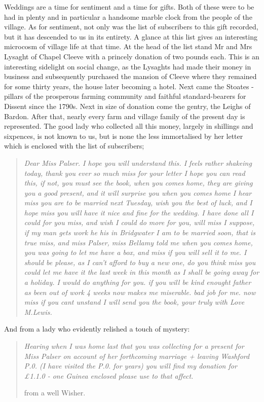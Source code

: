 Weddings are a time for sentiment and a time for gifts. Both of these were to be had in plenty and in particular a handsome marble clock from the people of the village. As for sentiment, not only was the list of subscribers to this gift recorded, but it has descended to us in its entirety. A glance at this list gives an interesting microcosm of village life at that time. At the head of the list stand Mr and Mrs Lysaght of Chapel Cleeve with a princely donation of two pounds each. This is an interesting sidelight on social change, as the Lysaghts had made their money in business and subsequently purchased the mansion of Cleeve where they remained for some thirty years, the house later becoming a hotel. Next came the Stoates - pillars of the prosperous farming community and faithful standard-bearers for Dissent since the 1790s. Next in size of donation come the gentry, the Leighs of Bardon. After that, nearly every farm and village family of the present day is represented. The good lady who collected all this money, largely in shillings and sixpences, is not known to us, but is none the less immortalised by her letter which is enclosed with the list of subscribers;

\begin{quote}
\textit{Dear Miss Palser. I hope you will understand this. I feels rather shakeing today, thank you ever so much miss for your letter I hope you can read this, if not, you must see the book, when you comes home, they are giving you a good present, and it will surprise you when you comes home I hear miss you are to be married next Tuesday, wish you the best of luck, and I hope miss you will have it nice and fine for the wedding. I have done all I could for you miss, and wish I could do more for you, will miss I suppose, if my man gets work he his in Bridgwater I am to be married soon, that is true miss, and miss Palser, miss Bellamy told me when you comes home, you was going to let me have a box, and miss if you will sell it to me. I should be please, as I can't afford to buy a new one, do you think miss you could let me have it the last week in this month as I shall be going away for a holiday. I would do anything for you. if you will be kind enought father as been out of work 4 weeks now makes me miserable. bad job for me. now miss if you cant unstand I will send you the book, your truly with Love M.Lewis.}
\end{quote}

And from a lady who evidently relished a touch of mystery:


\begin{quote}
\textit{Hearing when I was home last that you was collecting for a present for Miss Palser on account of her forthcoming marriage + leaving Washford P.0. (I have visited the P.0. for years) you will find my donation for £1.1.0 - one Guinea enclosed please use to that affect.}

from a well Wisher.
\end{quote}

